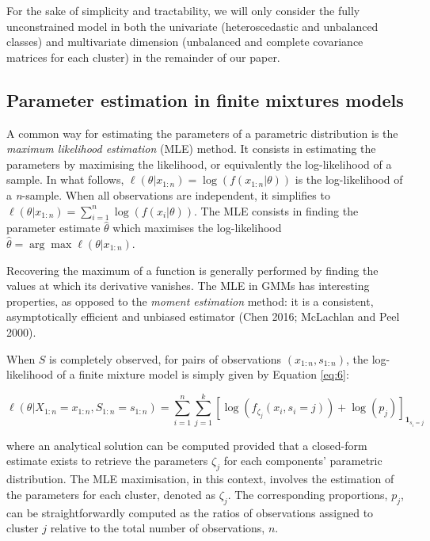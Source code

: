 For the sake of simplicity and tractability, we will only consider the
fully unconstrained model in both the univariate (heteroscedastic and
unbalanced classes) and multivariate dimension (unbalanced and complete
covariance matrices for each cluster) in the remainder of our paper.

\hypertarget{parameter-estimation-in-finite-mixtures-models}{%
\subsection{Parameter estimation in finite mixtures models}\label{parameter-estimation-in-finite-mixtures-models}}

A common way for estimating the parameters of a parametric distribution is
the \emph{maximum likelihood estimation} (MLE) method. It consists in
estimating the parameters by maximising the likelihood, or
equivalently the log-likelihood of a sample. In what follows,
\(\ell(\theta|x_{1:n})=\log (f(x_{1:n}|\theta))\) is the log-likelihood of
a \emph{n}-sample. When all observations are independent, it simplifies to
\(\ell(\theta|x_{1:n}) = \sum_{i=1}^n \log (f(x_i|\theta))\). The MLE
consists in finding the parameter estimate \(\hat{\theta}\) which maximises the
log-likelihood \(\hat{\theta} = \arg \max \ell (\theta | x_{1:n})\).

Recovering the maximum of a function is generally performed by
finding the values at which its derivative vanishes. The MLE in GMMs
has interesting properties, as opposed to the \emph{moment estimation}
method: it is a consistent, asymptotically efficient and unbiased
estimator (Chen 2016; McLachlan and Peel 2000).

When \(S\) is completely observed, for pairs of observations
\((x_{1:n}, s_{1:n})\), the log-likelihood of a finite mixture model is
simply given by Equation \eqref{eq:6}:

\begin{equation}
\ell(\theta|X_{1:n}=x_{1:n}, S_{1:n}=s_{1:n})=\sum_{i=1}^n \sum_{j=1}^k \left[\log\left(f_{\zeta_j} (x_i, s_i=j)\right) + \log(p_j) \right]_{\mathbf{1}_{s_i=j}}
\label{eq:6}
\end{equation}

where an analytical solution can be computed provided that a closed-form estimate exists to retrieve the parameters \(\zeta_j\) for each components' parametric distribution. The MLE maximisation, in this context, involves the estimation of the parameters for each cluster, denoted as \(\zeta_j\). The corresponding proportions, \(p_j\), can be straightforwardly computed as the ratios of observations assigned to cluster \(j\) relative to the total number of observations, \(n\).

